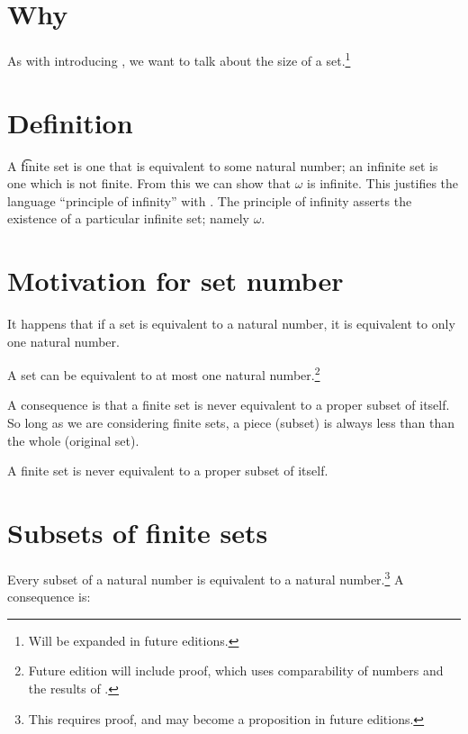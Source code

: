 

\section*{Why}

As with introducing , we want to talk about the size of a set.\footnote{Will be expanded in future editions.}

\section*{Definition}

A \t{finite} set is one that is equivalent to some natural number; an infinite set is one which is not finite.
From this we can show that $\omega $ is infinite.
This justifies the language ``principle of infinity'' with .
The principle of infinity asserts the existence of a particular infinite set; namely $\omega $.

\section*{Motivation for set number}

It happens that if a set is equivalent to a natural number, it is equivalent to only one natural number.

\begin{proposition}
A set can be equivalent to at most one natural number.\footnote{Future edition will include proof, which uses comparability of numbers and the results of .}
\end{proposition}

A consequence is that a finite set is never equivalent to a proper subset of itself.
So long as we are considering finite sets, a piece (subset) is always less than than the whole (original set).

\begin{proposition}
A finite set is never equivalent to a proper subset of itself.
\end{proposition}

\section*{Subsets of finite sets}

Every subset of a natural number is equivalent to a natural number.\footnote{This requires proof, and may become a proposition in future editions.}
A consequence is:

